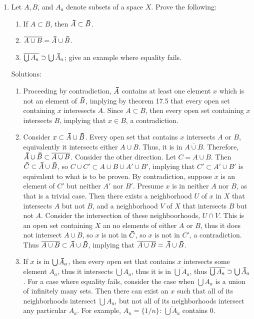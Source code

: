 \documentclass[12pt,letterpaper]{article}
\newcommand{\n}{\break}
\newcommand\thickbar[1]{\accentset{\rule{.4em}{.8pt}}{#1}}
\let\bar\thickbar
\begin{document}
\begin{enumerate}
  \item Let $A, B$, and $A_a$ denote subsets of a space $X$. Prove the following: 
    \begin{enumerate}
      \item If $A\subset B$, then $\bar{A}\subset\bar{B}$. 
      \item $\overline{A\cup B} = \bar{A}\cup \bar{B}$.
      \item $\overline{\bigcup A_a} \supset \bigcup \bar{A}_a$; give an example where equality fails.
    \end{enumerate}
    Solutions:
    \begin{enumerate}
    \item Proceeding by contradiction, $\bar{A}$ contains at least one element $x$ which is not an element of $\bar{B}$, implying by theorem 17.5 that every open set containing $x$ interesects $A$. Since $A\subset B$, then every open set containing $x$ intersects $B$, implying that $x\in B$, a contradiction.
    \item Consider $x\subset \bar{A}\cup\bar{B}$. Every open set that contains $x$ intersects $A$ or $B$, equivalently it intersects either $A\cup B$. Thus, it is in $\overline{A\cup B}$. Therefore, $\bar{A}\cup\bar{B} \subset \overline{A\cup B}$.\n
      \indent Consider the other direction. Let $C=A\cup B$. Then $\bar{C}\subset\bar{A}\cup\bar{B}$, so $C\cup C' \subset A \cup B \cup A' \cup B'$, implying that $C' \subset A' \cup B'$ is equivalent to what is to be proven. By contradiction, suppose $x$ is an element of $C'$ but neither $A'$ nor $B'$. Presume $x$ is in neither $A$ nor $B$, as that is a trivial case. Then there exists a neighborhood $U$ of $x$ in $X$ that intersects $A$ but not $B$, and a neighborhood $V$ of $X$ that intersects $B$ but not $A$. Consider the intersection of these neighboorhoods, $U\cap V$. This is an open set containing $X$ an no elements of either $A$ or $B$, thus it does not intersect $A\cup B$, so $x$ is not in $\bar{C}$, so $x$ is not in $C'$, a contradiction. Thus $\overline{A\cup B}\subset \bar{A}\cup\bar{B}$, implying that $\overline{A\cup B}=\bar{A}\cup\bar{B}$.
    \item If $x$ is in $\bigcup \bar{A}_a$, then every open set that contains $x$ intersects some element $A_a$, thus it intersects $\bigcup A_a$, thus it is in $\overline{\bigcup A_a}$, thus $\overline{\bigcup A_a} \supset\bigcup\bar{A}_a$. For a case where equality fails, consider the case when $\bigcup A_a$ is a union of infinitely many sets. Then there can exist an $x$ such that all of its neighborhoods intersect $\bigcup A_a$, but not all of its neighborhoods intersect any particular $A_a$. For example, $A_n=\{1/n\}$: $\overline{\bigcup A_a}$ contains 0.

\end{enumerate}
\end{enumerate}
\end{document}
